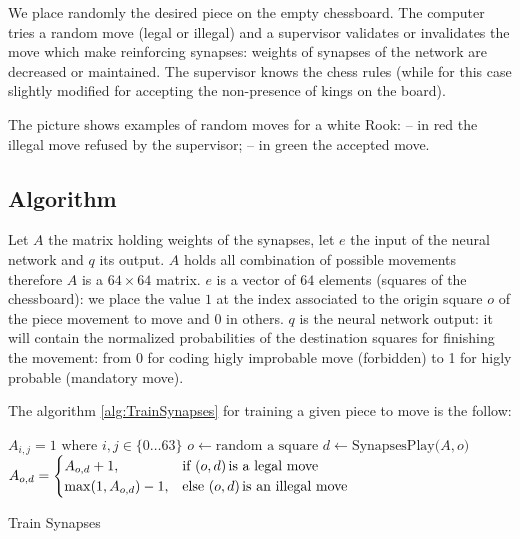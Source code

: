 \documentclass[a4paper,10pt]{article}
\begin{document}
We place randomly the desired piece on the empty chessboard. The computer tries
a random move (legal or illegal) and a supervisor validates or invalidates the
move which make reinforcing synapses: weights of synapses of the network are
decreased or maintained. The supervisor knows the chess rules (while for this
case slightly modified for accepting the non-presence of kings on the board).

\chessboard[
  setpieces={Re4},
  pgfstyle=straightmove,
  arrow=stealth,
  linewidth=.25ex,
  padding=1ex,
  pgfstyle=straightmove,
  shortenstart=1ex,
  showmover=true,
  color=red!75!white,
  markmoves={e4-g5},
  color=green!75!white,
  markmoves={e4-g4}
]

The picture shows examples of random moves for a white Rook: -- in red the
illegal move refused by the supervisor; -- in green the accepted move.

\subsection{Algorithm}

Let $A$ the matrix holding weights of the synapses, let $e$ the input of the
neural network and $q$ its output. $A$ holds all combination of possible
movements therefore $A$ is a $64 \times 64$ matrix. $e$ is a vector of $64$
elements (squares of the chessboard): we place the value $1$ at the index
associated to the origin square $o$ of the piece movement to move and $0$ in
others. $q$ is the neural network output: it will contain the normalized
probabilities of the destination squares for finishing the movement: from 0 for
coding higly improbable move (forbidden) to 1 for higly probable (mandatory
move).

\newpage
The algorithm \ref{alg:TrainSynapses} for training a given piece to move is the
follow:

\begin{algorithm}
  \label{alg:TrainSynapses}
  \DontPrintSemicolon
  $A_{i,j} = 1 \text{ where } i,j \in \{0 \dotsc 63\}$\;
  {
    $o \gets \text{random a square}$\;
    $d \gets \text{SynapsesPlay(}A,o\text{)}$\;
    $A_{o,d} =
    \begin{cases}
      A_{o,d} + 1,& \text{if } (o, d) \text{\,is a legal move} \\
      \max(1,A_{o,d}) - 1,& \text{else } (o, d) \text{\,is an illegal move}
    \end{cases}
    $\;
  }
  \caption{Train Synapses}
\end{algorithm}
\end{document}
